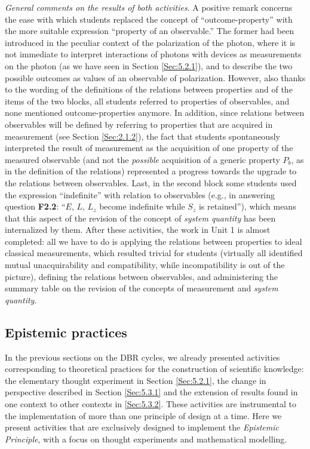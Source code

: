 \documentclass[twocolumn,secnumarabic,amssymb, nobibnotes, aps, prd, nofootinbib]{revtex4-2}
\begin{document}
\emph{General comments on the results of both activities}. A positive remark concerns the ease with which students replaced the concept of ``outcome-property'' with the more suitable expression ``property of an observable.'' The former had been introduced in the peculiar context of the polarization of the photon, where it is not immediate to interpret interactions of photons with devices as measurements on the photon (as we have seen in Section \ref{Sec:5.2.1}), and to describe the two possible outcomes as values of an observable of polarization. However, also thanks to the wording of the definitions of the relations between properties and of the items of the two blocks, all students referred to properties of observables, and none mentioned outcome-properties anymore. In addition, since relations between observables will be defined by referring to properties that are acquired in measurement (see Section \ref{Sec:2.1.2}), the fact that students spontaneously interpreted the result of measurement as the acquisition of one property of the measured observable (and not the \emph{possible} acquisition of a generic property $P_b$, as in the definition of the relations) represented a progress towards the upgrade to the relations between observables. Last, in the second block some students used the expression ``indefinite'' with relation to observables (e.g., in answering question \textbf{F2.2}: ``$E$, $L$, $L_z$ become indefinite while $S_z$ is retained''), which means that this aspect of the revision of the concept of \emph{system quantity}  has been internalized by them. After these activities, the work in Unit 1 is almost completed: all we have to do is  applying the relations between properties to ideal classical measurements, which resulted trivial for students (virtually all identified mutual unacquirability and compatibility, while incompatibility is out of the picture), defining the relations between observables, and administering the summary table on the revision of the concepts of measurement and \emph{system quantity}.

\subsection{Epistemic practices} \label{Sec:5.4}

In the previous sections on the DBR cycles, we already presented activities corresponding to theoretical practices for the construction of scientific knowledge: the elementary thought experiment in Section \ref{Sec:5.2.1}, the change in perspective described in Section \ref{Sec:5.3.1} and the extension of results found in one context to other contexts in \ref{Sec:5.3.2}. These activities are instrumental to the implementation of more than one principle of design at a time. Here we present activities that are exclusively designed to implement the \emph{Epistemic Principle}, with a focus on thought experiments and mathematical modelling.
\end{document}
